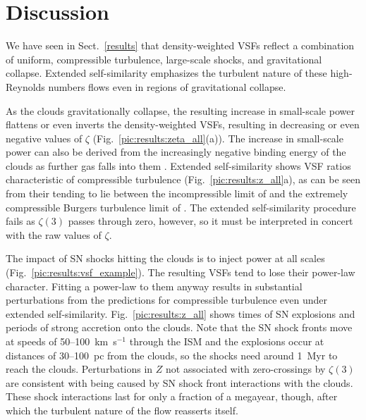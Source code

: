 \section{Discussion}\label{discussion}

We have seen in Sect.~\ref{results} that density-weighted VSFs reflect a combination of uniform, compressible turbulence, large-scale shocks, and gravitational collapse.  Extended self-similarity emphasizes the turbulent nature of these high-Reynolds numbers flows even in regions of gravitational collapse. 

As the clouds gravitationally collapse, the resulting increase in small-scale power flattens or even inverts the density-weighted VSFs, resulting in decreasing or even negative values of $\zeta$ (Fig.~\ref{pic:results:zeta_all}(a)). The increase in small-scale power can also be derived from the increasingly negative binding energy of the clouds as further gas falls into them .  Extended self-similarity shows VSF ratios characteristic of compressible turbulence (Fig.~\ref{pic:results:z_all}a), as can be seen from their tending to lie between the incompressible limit of \citet{She1994} and the extremely compressible Burgers turbulence limit of \citet{Boldyrev2002}.  The extended self-similarity procedure fails as $\zeta(3)$ passes through zero, however, so it must be interpreted in concert with the raw values of $\zeta$.

The impact of SN shocks hitting the clouds is to inject power at all scales (Fig.~\ref{pic:results:vsf_example}).  The resulting VSFs tend to lose their power-law character. Fitting a power-law to them anyway results in substantial perturbations from the predictions for compressible turbulence even under extended self-similarity.  Fig.~\ref{pic:results:z_all} shows times of SN explosions and periods of strong accretion onto the clouds.  Note that the SN shock fronts move at speeds of 50--100~km~s$^{-1}$ through the ISM and the explosions occur at distances of 30--100~pc from the clouds, so the shocks need around 1~Myr to reach the clouds. Perturbations in $Z$ not associated with zero-crossings by $\zeta(3)$ are consistent with being caused by SN shock front interactions with the clouds.  These shock interactions last for only a fraction of a megayear, though, after which the turbulent nature of the flow reasserts itself.





